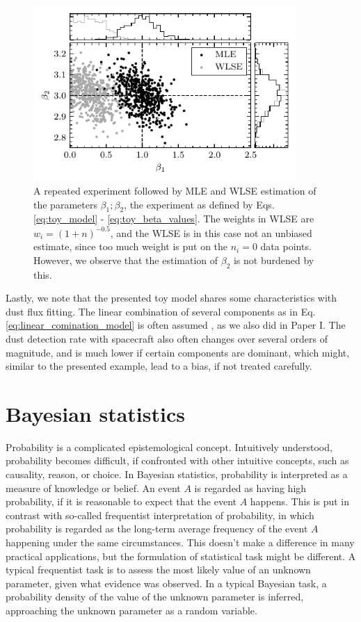 \begin{figure}[h]
 	\centering
 	\includegraphics[width=10cm]{figures/toy_model_draws_weighted.pdf}
 	\caption{A repeated experiment followed by MLE and WLSE estimation of the parameters $\beta_1; \beta_2$, the experiment as defined by Eqs. \ref{eq:toy_model} - \ref{eq:toy_beta_values}. The weights in WLSE are $w_i = (1+n)^{-0.5}$, and the WLSE is in this case not an unbiased estimate, since too much weight is put on the $n_i=0$ data points. However, we observe that the estimation of $\beta_2$ is not burdened by this.}
 	\label{fig:toy_model_draws_weighted}
\end{figure}

Lastly, we note that the presented toy model shares some characteristics with dust flux fitting. The linear combination of several components as in Eq. \ref{eq:linear_comination_model} is often assumed \citep{szalay2021collisional,zaslavsky2012interplanetary}, as we also did in Paper I. The dust detection rate with spacecraft also often changes over several orders of magnitude, and is much lower if certain components are dominant, which might, similar to the presented example, lead to a bias, if not treated carefully. 

\section{Bayesian statistics}

Probability is a complicated epistemological concept. Intuitively understood, probability becomes difficult, if confronted with other intuitive concepts, such as causality, reason, or choice. In Bayesian statistics, probability is interpreted as a measure of knowledge or belief. An event $A$ is regarded as having high probability, if it is reasonable to expect that the event $A$ happens. This is put in contrast with so-called frequentist interpretation of probability, in which probability is regarded as the long-term average frequency of the event $A$ happening under the same circumstances. This doesn't make a difference in many practical applications, but the formulation of statistical task might be different. A typical frequentist task is to assess the most likely value of an unknown parameter, given what evidence was observed. In a typical Bayesian task, a probability density of the value of the unknown parameter is inferred, approaching the unknown parameter as a random variable.  

